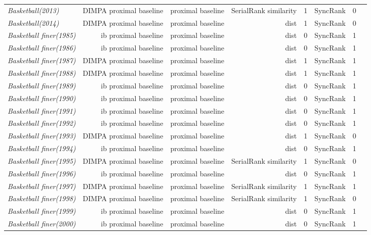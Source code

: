 \documentclass[nohyperref]{article}
\theoremstyle{plain}
\theoremstyle{definition}
\theoremstyle{remark}
\begin{document}
\begin{table*}[!ht]
{\begin{tabular}{lrrrrrrr}
			{\it Basketball(2013)} & DIMPA proximal baseline & proximal baseline & SerialRank similarity & 1 & SyncRank & 0 \\
			{\it Basketball(2014)} & DIMPA proximal baseline & proximal baseline & dist & 1 & SyncRank & 0 \\
			{\it Basketball finer(1985)} & ib proximal baseline & proximal baseline & dist & 0 & SyncRank & 1 \\
			{\it Basketball finer(1986)} & ib proximal baseline & proximal baseline & dist & 0 & SyncRank & 1 \\
			{\it Basketball finer(1987)} & DIMPA proximal baseline & proximal baseline & dist & 1 & SyncRank & 1 \\
			{\it Basketball finer(1988)} & DIMPA proximal baseline & proximal baseline & dist & 1 & SyncRank & 1 \\
			{\it Basketball finer(1989)} & ib proximal baseline & proximal baseline & dist & 0 & SyncRank & 1 \\
			{\it Basketball finer(1990)} & ib proximal baseline & proximal baseline & dist & 0 & SyncRank & 1 \\
			{\it Basketball finer(1991)} & ib proximal baseline & proximal baseline & dist & 0 & SyncRank & 1 \\
			{\it Basketball finer(1992)} & ib proximal baseline & proximal baseline & dist & 0 & SyncRank & 1 \\
			{\it Basketball finer(1993)} & DIMPA proximal baseline & proximal baseline & dist & 1 & SyncRank & 0 \\
			{\it Basketball finer(1994)} & ib proximal baseline & proximal baseline & dist & 0 & SyncRank & 1 \\
			{\it Basketball finer(1995)} & DIMPA proximal baseline & proximal baseline & SerialRank similarity & 1 & SyncRank & 0 \\
			{\it Basketball finer(1996)} & ib proximal baseline & proximal baseline & dist & 0 & SyncRank & 1 \\
			{\it Basketball finer(1997)} & DIMPA proximal baseline & proximal baseline & SerialRank similarity & 1 & SyncRank & 1 \\
			{\it Basketball finer(1998)} & DIMPA proximal baseline & proximal baseline & SerialRank similarity & 1 & SyncRank & 0 \\
			{\it Basketball finer(1999)} & ib proximal baseline & proximal baseline & dist & 0 & SyncRank & 1 \\
			{\it Basketball finer(2000)} & ib proximal baseline & proximal baseline & dist & 0 & SyncRank & 1 \\

\end{tabular}}
\end{table*}
\end{document}
